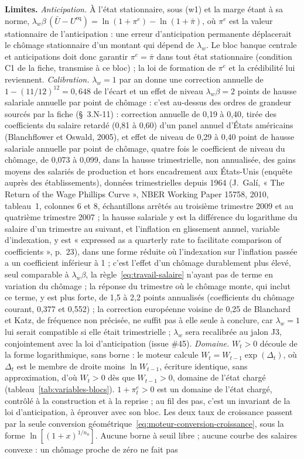 \documentclass[11pt,a4paper]{article}
\newcommand{\limites}{\par\noindent\textbf{Limites.} }
\begin{document}
\begin{lecture}
\limites \emph{Anticipation.} À l'état stationnaire, sous (w1) et la marge étant à sa norme, $\lambda_w\beta\,(\bar U - U^{\mathrm{eq}}) = \ln(1 + \pi^e) - \ln(1 + \bar\pi)$, où $\pi^e$ est la valeur stationnaire de l'anticipation : une erreur d'anticipation permanente déplacerait le chômage stationnaire d'un montant qui dépend de $\lambda_w$. Le bloc banque centrale et anticipations doit donc garantir $\pi^e = \bar\pi$ dans tout état stationnaire (condition C1 de la fiche, transmise à ce bloc) ; la loi de formation de $\pi^e$ et la crédibilité lui reviennent. \emph{Calibration.} $\lambda_w = 1$ par an donne une correction annuelle de $1 - (11/12)^{12} = 0{,}648$ de l'écart et un effet de niveau $\lambda_w\beta = 2$ points de hausse salariale annuelle par point de chômage : c'est au-dessus des ordres de grandeur sourcés par la fiche (\S~3.N-11) : correction annuelle de 0,19 à 0,40, tirée des coefficients du salaire retardé (0,81 à 0,60) d'un panel annuel d'États américains (Blanchflower et Oswald, 2005), et effet de niveau de 0,29 à 0,40 point de hausse salariale annuelle par point de chômage, quatre fois le coefficient de niveau du chômage, de 0,073 à 0,099, dans la hausse trimestrielle, non annualisée, des gains moyens des salariés de production et hors encadrement aux États-Unis (enquête auprès des établissements), données trimestrielles depuis 1964 (J.~Galí, « The Return of the Wage Phillips Curve », NBER Working Paper 15758, 2010, tableau~1, colonnes 6 et 8, échantillons arrêtés au troisième trimestre 2009 et au quatrième trimestre 2007 ; la hausse salariale y est la différence du logarithme du salaire d'un trimestre au suivant, et l'inflation en glissement annuel, variable d'indexation, y est « expressed as a quarterly rate to facilitate comparison of coefficients », p.~23), dans une forme réduite où l'indexation sur l'inflation passée a un coefficient inférieur à 1 ; c'est l'effet d'un chômage durablement plus élevé, seul comparable à $\lambda_w\beta$, la règle~\eqref{eq:travail-salaire} n'ayant pas de terme en variation du chômage ; la réponse du trimestre où le chômage monte, qui inclut ce terme, y est plus forte, de 1,5 à 2,2 points annualisés (coefficients du chômage courant, 0,377 et 0,552) ; la correction européenne voisine de 0,25 de Blanchard et Katz, de fréquence non précisée, ne suffit pas à elle seule à conclure, car $\lambda_w = 1$ lui serait compatible si elle était trimestrielle ; $\lambda_w$ sera recalibrée au jalon J3, conjointement avec la loi d'anticipation (issue \#45). \emph{Domaine.} $W_t > 0$ découle de la forme logarithmique, sans borne : le moteur calcule $W_t = W_{t-1} \exp(\Delta_t)$, où $\Delta_t$ est le membre de droite moins $\ln W_{t-1}$, écriture identique, sans approximation, d'où $W_t > 0$ dès que $W_{t-1} > 0$, domaine de l'état chargé (tableau~\ref{tab:variables-blocs}). $1 + \pi^e_t > 0$ est un domaine de l'état chargé, contrôlé à la construction et à la reprise ; au fil des pas, c'est un invariant de la loi d'anticipation, à éprouver avec son bloc. Les deux taux de croissance passent par la seule conversion géométrique~\eqref{eq:moteur-conversion-croissance}, sous la forme $\ln[(1 + x)^{1/n_a}]$. Aucune borne à seuil libre ; aucune courbe des salaires convexe : un chômage proche de zéro ne fait pas 
\end{lecture}
\end{document}

